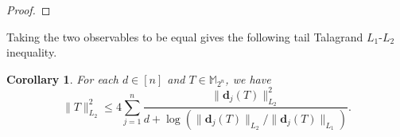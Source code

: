 \documentclass{amsbook}
\newtheorem{corollary}[theorem]{Corollary}
\theoremstyle{definition}
\theoremstyle{remark}
\numberwithin{section}{chapter}
\numberwithin{equation}{chapter}
\newcommand{\M}{\mathbb{M}}
\newcommand{\1}{\mathbf{1}}
\newcommand{\dc}{\mathbf{d}}
\begin{document}
\begin{proof}
\end{proof}

Taking the two observables to be equal gives the following tail Talagrand $L_{1}$-$L_{2}$ inequality.
\begin{corollary}\label{tala-d-tail}
For each $d\in [n]$ and $T\in \M_{2^{n}}$, we have
\[
\|T\|^{2}_{L_{2}}\leq 4\sum_{j=1}^{n}\frac{\|\dc_{j}(T)\|^{2}_{L_{2}}}{d+\log\left(\|\dc_{j}(T)\|_{L_{2}}/\|\dc_{j}(T)\|_{L_{1}}\right)}.
\]
\end{corollary}
\end{document}
